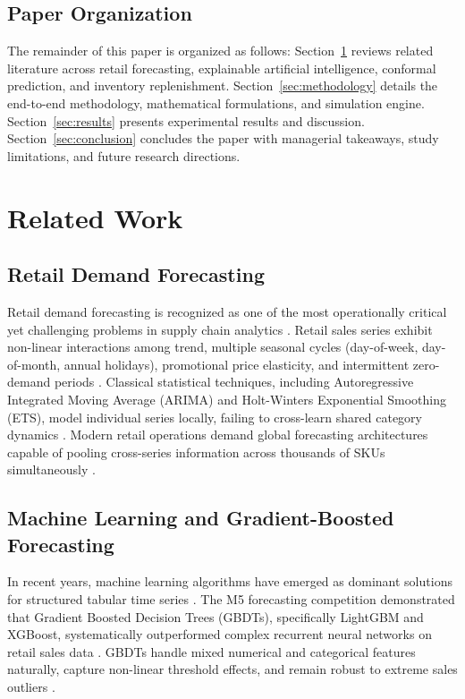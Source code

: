 \documentclass[11pt,a4paper]{article}
\begin{document}
\subsection{Paper Organization}
\label{sec:intro_org}
The remainder of this paper is organized as follows: Section~\ref{sec:related} reviews related literature across retail forecasting, explainable artificial intelligence, conformal prediction, and inventory replenishment. Section~\ref{sec:methodology} details the end-to-end methodology, mathematical formulations, and simulation engine. Section~\ref{sec:results} presents experimental results and discussion. Section~\ref{sec:conclusion} concludes the paper with managerial takeaways, study limitations, and future research directions.

\section{Related Work}
\label{sec:related}

\subsection{Retail Demand Forecasting}
\label{sec:related_retail}
Retail demand forecasting is recognized as one of the most operationally critical yet challenging problems in supply chain analytics \cite{syntetos2016supply}. Retail sales series exhibit non-linear interactions among trend, multiple seasonal cycles (day-of-week, day-of-month, annual holidays), promotional price elasticity, and intermittent zero-demand periods \cite{mitra2022comparative, venkiteela2025machine}. Classical statistical techniques, including Autoregressive Integrated Moving Average (ARIMA) and Holt-Winters Exponential Smoothing (ETS), model individual series locally, failing to cross-learn shared category dynamics \cite{mustapha2025forecasting}. Modern retail operations demand global forecasting architectures capable of pooling cross-series information across thousands of SKUs simultaneously \cite{alghurabli2025ai}.

\subsection{Machine Learning and Gradient-Boosted Forecasting}
\label{sec:related_gbdt}
In recent years, machine learning algorithms have emerged as dominant solutions for structured tabular time series \cite{chen2016xgboost, hobor2026comparative, swami2020}. The M5 forecasting competition demonstrated that Gradient Boosted Decision Trees (GBDTs), specifically LightGBM and XGBoost, systematically outperformed complex recurrent neural networks on retail sales data \cite{makridakis2022m5}. GBDTs handle mixed numerical and categorical features naturally, capture non-linear threshold effects, and remain robust to extreme sales outliers \cite{mitra2022comparative}.
\end{document}
